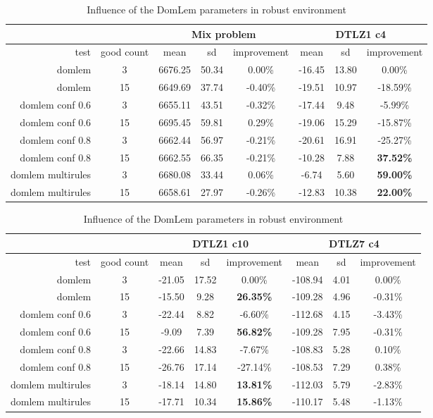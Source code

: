 \begin{table}[htb]
  \centering
  \begin{tabular}{r c c c c c c c}
    & & \multicolumn{3}{c}{Mix problem} & \multicolumn{3}{c}{DTLZ1 c4} \\
    \hline
    test & good count & mean & sd & improvement & mean & sd & improvement \\
    \hline
    \hline
domlem             & 3   & 6676.25 & 50.34 & 0.00\% & -16.45 & 13.80 & 0.00\% \\
domlem             & 15 & 6649.69 & 37.74 & -0.40\% & -19.51 & 10.97 & -18.59\% \\
domlem conf 0.6 & 3   & 6655.11 & 43.51 & -0.32\% & -17.44 & 9.48 & -5.99\% \\
domlem conf 0.6 & 15 & 6695.45 & 59.81 & 0.29\% & -19.06 & 15.29 & -15.87\% \\
domlem conf 0.8 & 3   &  6662.44 & 56.97 & -0.21\% & -20.61 & 16.91 & -25.27\% \\
domlem conf 0.8 & 15 & 6662.55 & 66.35 & -0.21\% & -10.28 & 7.88 & \textbf{37.52\%} \\
domlem multirules & 3  & 6680.08 & 33.44 & 0.06\% & -6.74 & 5.60 & \textbf{59.00\%} \\
domlem multirules & 15 & 6658.61 & 27.97 & -0.26\% & -12.83 & 10.38 & \textbf{22.00\%} \\    \hline
  \end{tabular}
  \caption{Influence of the DomLem parameters in robust environment}
  \label{t:un_domlem_1}
\end{table}

 \begin{table}[htb]
  \centering
  \begin{tabular}{r c c c c c c c}
    & & \multicolumn{3}{c}{DTLZ1 c10} & \multicolumn{3}{c}{DTLZ7 c4} \\
    \hline
    test & good count & mean & sd & improvement & mean & sd & improvement \\
    \hline
    \hline
domlem               & 3 & -21.05 & 17.52 & 0.00\% & -108.94 & 4.01 & 0.00\% \\
domlem               & 15 & -15.50 & 9.28 & \textbf{26.35\%} & -109.28 & 4.96 & -0.31\% \\
domlem conf 0.6 & 3 &  -22.44 & 8.82 & -6.60\% & -112.68 & 4.15 & -3.43\% \\
domlem conf 0.6 & 15 & -9.09 & 7.39 & \textbf{56.82\%} & -109.28 & 7.95 & -0.31\% \\
domlem conf 0.8 & 3 &  -22.66 & 14.83 & -7.67\% & -108.83 & 5.28 & 0.10\% \\
domlem conf 0.8 &  15 &-26.76 & 17.14 & -27.14\% & -108.53 & 7.29 & 0.38\% \\
domlem multirules & 3 &  -18.14 & 14.80 & \textbf{13.81\%} & -112.03 & 5.79 & -2.83\% \\
domlem multirules &  15 &-17.71 & 10.34 & \textbf{15.86\%} & -110.17 & 5.48 & -1.13\% \\
    \hline
  \end{tabular}
  \caption{Influence of the DomLem parameters in robust environment}
  \label{t:un_domlem_2}
\end{table}


